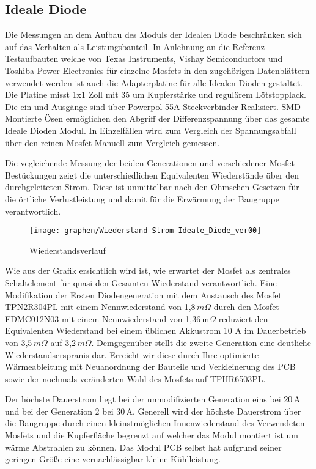 \subsection{Ideale Diode}

Die Messungen an dem Aufbau des Moduls der Idealen Diode beschränken sich auf das Verhalten als Leistungsbauteil. 
In Anlehnung an die Referenz Testaufbauten welche von Texas Instruments, Vishay Semiconductors und Toshiba Power Electronics für einzelne Mosfets in den zugehörigen Datenblättern verwendet werden ist auch die Adapterplatine für alle Idealen Dioden gestaltet.
Die Platine misst 1x1 Zoll mit 35 um Kupferstärke und regulärem Lötstopplack. Die ein und Ausgänge sind über Powerpol 55A Steckverbinder Realisiert. SMD Montierte Ösen ermöglichen den Abgriff der Differenzspannung über das gesamte Ideale Dioden Modul. In Einzelfällen wird zum Vergleich der Spannungsabfall über den reinen Mosfet Manuell zum Vergleich gemessen.

Die vegleichende Messung der beiden Generationen und verschiedener Mosfet Bestückungen zeigt die unterschiedlichen Equivalenten Wiederstände über den durchgeleiteten Strom.
Diese ist unmittelbar nach den Ohmschen Gesetzen für die örtliche Verlustleistung und damit für die Erwärmung der Baugruppe verantwortlich.

\begin{figure}[H]
\centering
\texttt{[image: graphen/Wiederstand-Strom-Ideale\_Diode\_ver00]} 
\caption{Wiederstandsverlauf} 
\label{fig:Wiederstandsverlauf}
\end{figure}


Wie aus der Grafik ersichtlich wird ist, wie erwartet der Mosfet als zentrales Schaltelement für quasi den Gesamten Wiederstand verantwortlich.
Eine Modifikation der Ersten Diodengeneration mit dem Austausch des Mosfet TPN2R304PL mit einem Nennwiederstand von 1,8\,$m\Omega$ \cite{TPN2R304PL} durch den Mosfet FDMC012N03 mit einem Nennwiederstand von 1,36\,m$\Omega$ \cite{FDMC012N03} reduziert den Equivalenten Wiederstand bei einem üblichen Akkustrom 10 A im Dauerbetrieb von 3,5\,$m\Omega$  auf 3,2\,$m\Omega$.
Demgegenüber stellt die zweite Generation eine deutliche Wiederstandserspranis dar.
Erreicht wir diese durch Ihre optimierte Wärmeableitung mit Neuanordnung der Bauteile und Verkleinerung des PCB sowie der nochmals veränderten Wahl des Mosfets auf TPHR6503PL.

Der höchste Dauerstrom liegt bei der unmodifizierten Generation eins bei 20\,A und bei der Generation 2 bei 30\,A. 
Generell wird der höchste Dauerstrom über die Baugruppe durch einen kleinstmöglichen Innenwiederstand des Verwendeten Mosfets und die Kupferfläche begrenzt auf welcher das Modul montiert ist um wärme Abstrahlen zu können. Das Modul PCB selbst hat aufgrund seiner geringen Größe eine vernachlässigbar kleine Kühlleistung.

